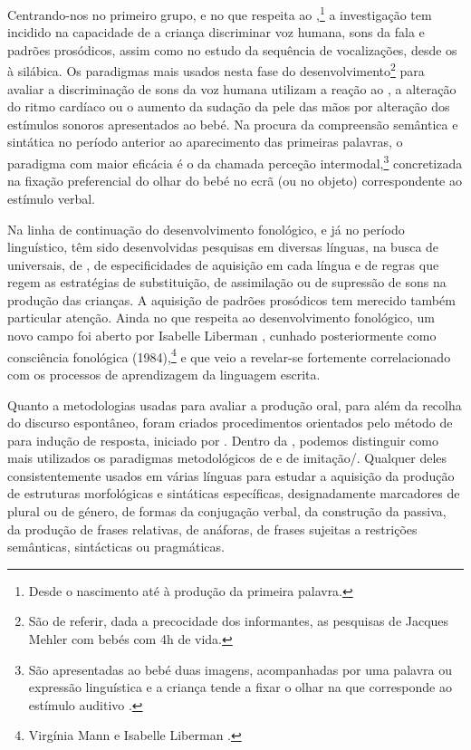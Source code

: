 \documentclass[output=paper]{LSP/langsci}
\begin{document}
Centrando-nos no primeiro grupo, e no que respeita ao ,\footnote{Desde o nascimento até à produção da primeira palavra.} a investigação tem incidido na capacidade de a criança discriminar voz humana, sons da fala e padrões prosódicos, assim como no estudo da sequência de vocalizações, desde os  à  silábica. Os paradigmas mais usados nesta fase do desenvolvimento\footnote{São de referir, dada a precocidade dos informantes, as pesquisas de Jacques Mehler \citeyearpar{mehler_etal1988} com bebés com 4h de vida.} para avaliar a discriminação de sons da voz humana utilizam a reação ao , a alteração do ritmo cardíaco ou o aumento da sudação da pele das mãos por alteração dos estímulos sonoros apresentados ao bebé. Na procura da compreensão semântica e sintática no período anterior ao aparecimento das primeiras palavras, o paradigma com maior eficácia é o da chamada perceção intermodal,\footnote{São apresentadas ao bebé duas imagens, acompanhadas por uma palavra ou expressão linguística e a criança tende a fixar o olhar na que corresponde ao estímulo auditivo \citep[cf.][]{mcdaniel_etal1998}.} concretizada na fixação preferencial do olhar do bebé no ecrã (ou no objeto) correspondente ao estímulo verbal.

Na linha de continuação do desenvolvimento fonológico, e já no período linguístico, têm sido desenvolvidas pesquisas em diversas línguas, na busca de universais, de , de especificidades de aquisição em cada língua e de regras que regem as estratégias de substituição, de assimilação ou de supressão de sons na produção das crianças. A aquisição de padrões prosódicos tem merecido também particular atenção. Ainda no que respeita ao desenvolvimento fonológico, um novo campo foi aberto por Isabelle Liberman \citeyearpar{liberman1973}, cunhado posteriormente como consciência fonológica (1984),\footnote{Virgínia Mann e Isabelle Liberman \citeyearpar{mannliberman1984}.} e que veio a revelar-se fortemente correlacionado com os processos de aprendizagem da linguagem escrita.

Quanto a metodologias usadas para avaliar a produção oral, para além da recolha do discurso espontâneo, foram criados procedimentos orientados pelo método de  para indução de resposta, iniciado por \citet{berko1958}. Dentro da , podemos distinguir como mais utilizados os paradigmas metodológicos de  e de imitação/. Qualquer deles consistentemente usados em várias línguas para estudar a aquisição da produção de estruturas morfológicas e sintáticas específicas, designadamente marcadores de plural ou de género, de formas da conjugação verbal, da construção da passiva, da produção de frases relativas, de anáforas, de frases sujeitas a restrições semânticas, sintácticas ou pragmáticas.
\end{document}
